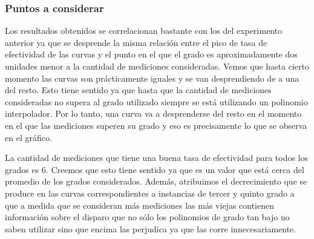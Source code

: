 \subsubsection{Puntos a considerar}
Los resultados obtenidos se correlacionan bastante con los del experimento anterior ya que se desprende la misma
relación entre el pico de tasa de efectividad de las curvas y el punto en el que el grado es aproximadamente
dos unidades menor a la cantidad de mediciones consideradas. Vemos que hasta cierto momento las curvas son prácticamente iguales
y se van desprendiendo de a una del resto. Esto tiene sentido ya que hasta que la cantidad de mediciones consideradas no supera
al grado utilizado siempre se está utilizando un polinomio interpolador. Por lo tanto, una curva va a desprenderse del resto
en el momento en el que las mediciones superen su grado y eso es precisamente lo que se observa en el gráfico.
\par
La cantidad de mediciones que tiene una buena tasa de efectividad para todos los grados es 6. Creemos que esto tiene sentido ya que 
es un valor que está cerca del promedio de los grados considerados. Además, atribuimos el decrecimiento que se produce en
las curvas correspondientes a instancias de tercer y quinto grado a que a medida que se consideran más mediciones las más
viejas contienen información sobre el disparo que no sólo los polinomios de grado tan bajo no saben utilizar sino que 
encima las perjudica ya que las corre innecesariamente.

